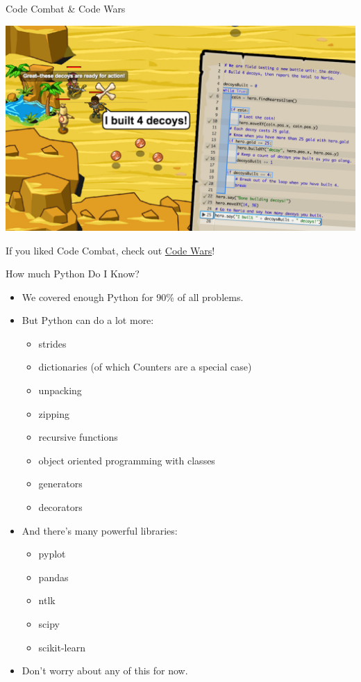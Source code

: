 \documentclass[xcolor={usenames,svgnames,x11names,dvipsnames,table}]{beamer}
\begin{document}
\begin{frame}{Code Combat \& Code Wars}
    \centering

    \includegraphics[width=.8\linewidth]{./img/codecombat}

    If you liked Code Combat, check out \href{https://www.codewars.com/}{Code Wars}!
\end{frame}

\begin{frame}{How much Python Do I Know?}
    \begin{itemize}
        \item We covered enough Python for 90\% of all problems.
        \item But Python can do a lot more:
            \begin{itemize}
                \item strides
                \item dictionaries (of which Counters are a special case)
                \item unpacking
                \item zipping
                \item recursive functions
                \item object oriented programming with classes
                \item generators
                \item decorators
            \end{itemize}
        \item And there's many powerful libraries:
            \begin{itemize}
                \item pyplot
                \item pandas
                \item ntlk
                \item scipy
                \item scikit-learn
            \end{itemize}
        \item Don't worry about any of this for now.
    \end{itemize}
\end{frame}
\end{document}
